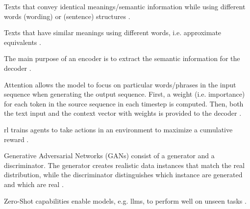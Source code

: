 \begin{definition}
    [Paraphrases]
    Texts that convey identical meanings/semantic information while using different words (wording) or (sentence) structures 
    \cite{fu_learning_2024,zhou_paraphrase_2021,palivela_optimization_2021,kurt_pehlivanoglu_comparative_2024,gohsen_captions_2023}.
\end{definition}

\begin{definition}
    Texts that have similar meanings using different words, i.e. approximate equivalents \cite{zhou_paraphrase_2025}.
\end{definition}

\begin{definition}
    [Encoder]
    The main purpose of an encoder is to extract the semantic information for the decoder \cite{zhou_paraphrase_2021}.
\end{definition}

\begin{definition}
    Attention allows the model to focus on particular words/phrases in the input sequence when generating the output sequence.
    First, a weight (i.e. importance) for each token in the source sequence in each timestep is computed.
    Then, both the text input and the context vector with weights is provided to the decoder \cite{zhou_paraphrase_2021}.
\end{definition}

\begin{definition}
    [\acl{rl}]
    \ac{rl} trains agents to take actions in an environment to maximize a cumulative reward \cite{zhou_paraphrase_2021}.
\end{definition}

\begin{definition}
    [GANs]
    Generative Adversarial Networks (GANs) consist of a generator and a discriminator.
    The generator creates realistic data instances that match the real distribution, 
    while the discriminator distinguishes which instance are generated and which are real \cite{zhou_paraphrase_2021}.
\end{definition}

\begin{definition}
    Zero-Shot capabilities enable models, e.g. \acp{llm}, to perform well on unseen tasks \cite{master_thesis_paraphrasing_2024}.
\end{definition}

